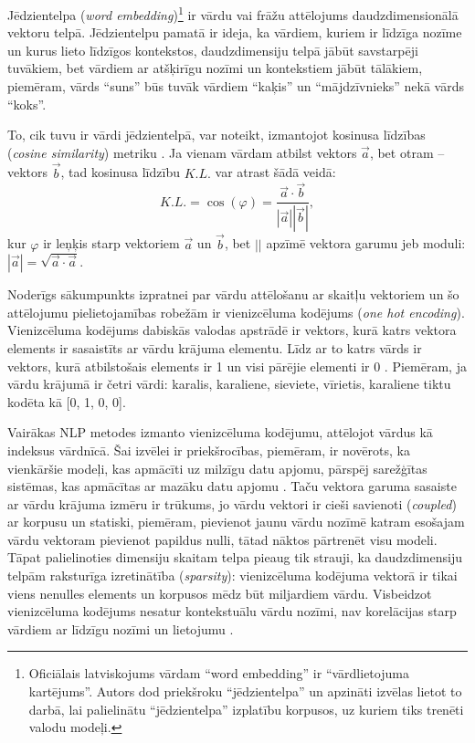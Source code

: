 Jēdzientelpa (\textit{word embedding})\footnote{Oficiālais latviskojums vārdam “word embedding” ir “vārdlietojuma kartējums”. Autors dod priekšroku “jēdzientelpa” un apzināti izvēlas lietot to darbā, lai palielinātu “jēdzientelpa” izplatību korpusos, uz kuriem tiks trenēti valodu modeļi.} ir vārdu vai frāžu attēlojums daudzdimensionālā vektoru telpā. Jēdzientelpu pamatā ir ideja, ka vārdiem, kuriem ir līdzīga nozīme un kurus lieto līdzīgos kontekstos, daudzdimensiju telpā jābūt savstarpēji tuvākiem, bet vārdiem ar atšķirīgu nozīmi un kontekstiem jābūt tālākiem, piemēram, vārds “suns” būs tuvāk vārdiem “kaķis” un “mājdzīvnieks” nekā vārds “koks”.

To, cik tuvu ir vārdi jēdzientelpā, var noteikt, izmantojot kosinusa līdzības (\textit{cosine similarity}) metriku \cite{dangeti2017}. Ja vienam vārdam atbilst vektors $\vec{a}$, bet otram -- vektors $\vec{b}$, tad kosinusa līdzību $K.L.$ var atrast šādā veidā: $$K.L. = \cos(\varphi) = \frac{\vec{a} \cdot \vec{b}}{|\vec{a}| |\vec{b}|},$$ 
kur $\varphi$ ir leņķis starp vektoriem $\vec{a}$ un $\vec{b}$, bet $||$ apzīmē vektora garumu jeb moduli: $|\vec{a}| = \sqrt{\vec{a} \cdot \vec{a}}$.



Noderīgs sākumpunkts izpratnei par vārdu attēlošanu ar skaitļu vektoriem un šo attēlojumu pielietojamības robežām ir vienizcēluma kodējums (\textit{one hot encoding}). Vienizcēluma kodējums dabiskās valodas apstrādē ir vektors, kurā katrs vektora elements ir sasaistīts ar vārdu krājuma elementu. Līdz ar to katrs vārds ir vektors, kurā atbilstošais elements ir 1 un visi pārējie elementi ir 0 \cite{colyer2016}. Piemēram, ja vārdu krājumā ir četri vārdi: karalis, karaliene, sieviete, vīrietis, karaliene tiktu kodēta kā [0, 1, 0, 0].

Vairākas NLP metodes izmanto vienizcēluma kodējumu, attēlojot vārdus kā indeksus vārdnīcā. Šai izvēlei ir priekšrocības, piemēram, ir novērots, ka vienkāršie modeļi, kas apmācīti uz milzīgu datu apjomu, pārspēj sarežģītas sistēmas, kas apmācītas ar mazāku datu apjomu \cite{word2vec2013}. Taču vektora garuma sasaiste ar vārdu krājuma izmēru ir trūkums, jo vārdu vektori ir cieši savienoti (\textit{coupled}) ar korpusu un statiski, piemēram, pievienot jaunu vārdu nozīmē katram esošajam vārdu vektoram pievienot papildus nulli, tātad nāktos pārtrenēt visu modeli. Tāpat palielinoties dimensiju skaitam telpa pieaug tik strauji, ka daudzdimensiju telpām raksturīga izretinātība (\textit{sparsity}): vienizcēluma kodējuma vektorā ir tikai viens nenulles elements un korpusos mēdz būt miljardiem 
vārdu. Visbeidzot vienizcēluma kodējums nesatur kontekstuālu vārdu nozīmi, nav korelācijas starp vārdiem ar līdzīgu nozīmi un lietojumu \cite{colyer2016}.


